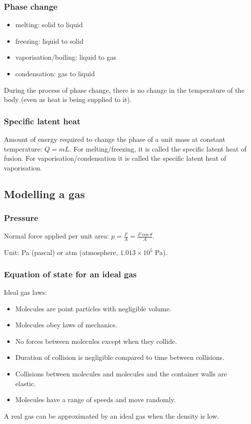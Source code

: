 \subsubsection{Phase change}
\begin{itemize}
    \item melting: solid to liquid
    \item freezing: liquid to solid
    \item vaporisation/boiling: liquid to gas
    \item condensation: gas to liquid
\end{itemize}
During the process of phase change, there is no change in the temperature of
the body (even as heat is being supplied to it).

\subsubsection{Specific latent heat}
Amount of energy required to change the phase of a unit mass at constant
temperature: $Q = mL$. For melting/freezing, it is called the specific latent
heat of fusion. For vaporisation/condensation it is called the specific latent
heat of vaporisation.

\subsection{Modelling a gas}

\subsubsection{Pressure}
Normal force applied per unit area: $p = \frac{F}{A} = \frac{F\cos\theta}{A}$.

Unit: Pa (pascal) or atm (atmosphere, $1.013 \times 10^5$ Pa).

\subsubsection{Equation of state for an ideal gas}
Ideal gas laws:
\begin{itemize}
    \item Molecules are point particles with negligible volume.
    \item Molecules obey laws of mechanics.
    \item No forces between molecules except when they collide.
    \item Duration of collision is negligible compared to time between
        collisions.
    \item Collisions between molecules and molecules and the container walls
        are elastic.
    \item Molecules have a range of speeds and move randomly.
\end{itemize}
A real gas can be approximated by an ideal gas when the density is low.

